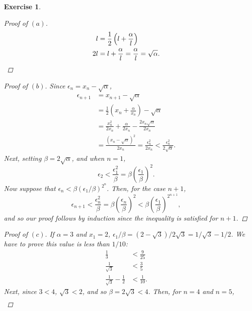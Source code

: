 \documentclass[10pt,letterpaper]{amsart}
\newtheorem{exercise}{Exercise}[section]
\theoremstyle{definition}
\theoremstyle{remark}
\numberwithin{equation}{exercise}
\begin{document}
\begin{multicols}{2}
\begin{exercise}
\begin{proof}[Proof of $(a)$]
      \begin{align*}
        l &= \frac{1}{2} \left( l + \frac{\alpha}{l} \right)\\
        2l &= l + \frac{\alpha}{l} = \frac{\alpha}{l} = \sqrt{\alpha}.\qedhere
      \end{align*}
    \end{proof}
    \begin{proof}[Proof of $(b)$]
      Since $\epsilon_n = x_n - \sqrt{\alpha}$,
      \begin{align*}
        \epsilon_{n+1} &= x_{n+1} - \sqrt{\alpha}\\
        &= \frac{1}{2}\left( x_n + \frac{\alpha}{x_n} \right) - \sqrt{\alpha}\\
        &= \frac{x_n^2}{2x_n} + \frac{\alpha}{2x_n} - \frac{2x_n\sqrt{\alpha}}{2x_n}\\
        &= \frac{(x_n - \sqrt{\alpha})^2}{2x_n}
        = \frac{\epsilon_n^2}{2x_n}
        < \frac{\epsilon_n^2}{2\sqrt{\alpha}}.
      \end{align*}
      Next, setting $\beta = 2\sqrt{\alpha}$, and when $n=1$,
      \begin{equation*}
        \epsilon_2 < \frac{\epsilon_1^2}{\beta} = \beta \left( \frac{\epsilon_1}{\beta} \right)^2.
      \end{equation*}
      Now suppose that $\epsilon_n < \beta\left(\epsilon_1/\beta \right)^{2^n}$. Then, for the case $n+1$,
      \begin{equation*}
        \epsilon_{n+1} < \frac{\epsilon_n^2}{\beta} = \beta \left( \frac{\epsilon_n}{\beta} \right)^2 < \beta\left( \frac{\epsilon_1}{\beta} \right)^{2^{n+1}},
      \end{equation*}
      and so our proof follows by induction since the inequality is satisfied for $n+1$.
    \end{proof}
    \begin{proof}[Proof of $(c)$]
      If $\alpha = 3$ and $x_1 = 2$, $\epsilon_1/\beta = (2 - \sqrt{3})/2\sqrt{3} = 1/\sqrt{3} - 1/2$. We have to prove this value is less than $1/10$:
      \begin{align*}
        \frac{1}{3} &< \frac{9}{25}\\
        \frac{1}{\sqrt{3}} &< \frac{3}{5}\\
        \frac{1}{\sqrt{3}} - \frac{1}{2} &< \frac{1}{10}.
      \end{align*}
      Next, since $3 < 4$, $\sqrt{3} < 2$, and so $\beta = 2\sqrt{3} < 4$. Then, for $n=4$ and $n=5$,
      \begin{align*}

\end{align*}
\end{proof}
\end{exercise}
\end{multicols}
\end{document}
